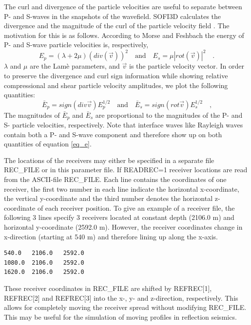 \documentclass{hitec}
\begin{document}
The curl and divergence of the particle velocities are useful to separate between P- and S-waves in the snapshots of the wavefield. SOFI3D calculates the divergence and the magnitude of the curl of the particle velocity field \cite{dougherty:88}. The motivation for this is as follows. According to Morse and Feshbach  the energy of P- and S-wave particle velocities is, respectively,
\begin{equation}
E_p=\left(\lambda + 2 \mu\right) (div(\vec{v}))^2 \quad \mbox{and} \quad E_s=\mu \left|rot(\vec{v})\right|^2 \quad\mbox{.}
\label{eq_E}
\end{equation}
$\lambda$ and $\mu$ are the Lam\`{e} parameters, and $\vec{v}$ is the particle velocity vector. In order to preserve the divergence and curl sign information  while showing relative compressional
and shear particle velocity amplitudes, we plot the following quantities:
\begin{equation}
\bar{E}_p=sign(div \vec{v}) E_p^{1/2} \quad \mbox{and} \quad \bar{E}_s= sign(rot\vec{v}) E_s^{1/2} \quad\mbox{,}
\label{eq_e}
\end{equation}
The magnitudes of $\bar{E}_p$ and $\bar{E}_s$ are proportional to the magnitudes of the P- and S- particle velocities, respectively. Note that interface waves like Rayleigh waves contain both a P- and S-wave component and therefore show up on both quantities of equation \ref{eq_e}.

The locations of the receivers may either be specified in a separate file REC\_FILE or in this parameter file. If READREC=1 receiver locations are read from the ASCII-file REC\_FILE. Each line contains the coordinates of one receiver, the first two number in each line indicate the horizontal x-coordinate, the vertical y-coordinate and the third number denotes the horizontal z-coordinate of each receiver position. To give an example of a receiver file, the following 3 lines specify 3 receivers located at constant depth (2106.0 m) and horizontal y-coordinate (2592.0 m). However, the receiver coordinates change in x-direction (starting at 540 m) and therefore lining up along the x-axis.  
\begin{verbatim}
540.0   2106.0   2592.0   
1080.0  2106.0   2592.0
1620.0  2106.0   2592.0
\end{verbatim}
These receiver coordinates in REC\_FILE are shifted by REFREC[1], REFREC[2] and REFREC[3] into the  x-, y- and z-direction, respectively. This allows for completely moving the receiver spread without modifying REC\_FILE. This may be useful for the simulation of moving profiles in reflection seismics.
\end{document}
